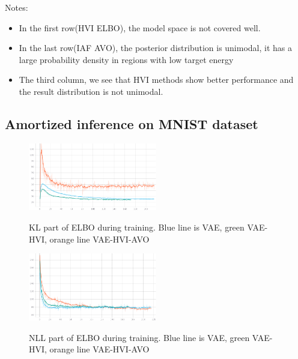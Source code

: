 \documentclass{article}
\begin{document}
Notes:
\begin{itemize}
\item In the first row(HVI ELBO), the model space is not covered well.
\item In the last row(IAF AVO), the posterior distribution is unimodal, it has a large probability density in regions with low target energy
\item The third column, we see that HVI methods show better performance and the result distribution is not unimodal.
\end{itemize}

\subsection{Amortized inference on MNIST dataset}

\begin{table}[ht]
    \centering
    \caption{Negative log likelihood for VAE, VAE-HVI and VAE-HVI-AVO}
    \label{table:vae_experiemnts}
\end{table}

\begin{figure}
    \caption{KL part of ELBO during training. Blue line is VAE, green VAE-HVI, orange line VAE-HVI-AVO}
    \centering
    \includegraphics[width=0.5\textwidth]{images/kl_part.png}
    \label{fig:vae_kl_train}
\end{figure}

\begin{figure}
    \caption{NLL part of ELBO during training. Blue line is VAE, green VAE-HVI, orange line VAE-HVI-AVO}
    \centering
    \includegraphics[width=0.5\textwidth]{images/nll_part.png}
    \label{fig:vae_nll_train}
\end{figure}
\end{document}
